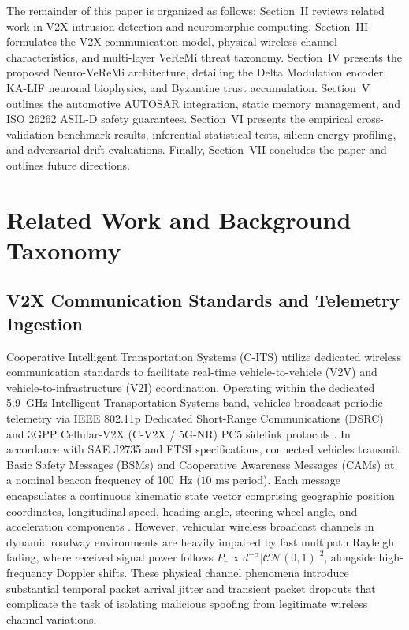 \documentclass[journal]{IEEEtran}
\begin{document}
The remainder of this paper is organized as follows: Section~II reviews related work in V2X intrusion detection and neuromorphic computing. Section~III formulates the V2X communication model, physical wireless channel characteristics, and multi-layer VeReMi threat taxonomy. Section~IV presents the proposed Neuro-VeReMi architecture, detailing the Delta Modulation encoder, KA-LIF neuronal biophysics, and Byzantine trust accumulation. Section~V outlines the automotive AUTOSAR integration, static memory management, and ISO 26262 ASIL-D safety guarantees. Section~VI presents the empirical cross-validation benchmark results, inferential statistical tests, silicon energy profiling, and adversarial drift evaluations. Finally, Section~VII concludes the paper and outlines future directions.

\section{Related Work and Background Taxonomy}

\subsection{V2X Communication Standards and Telemetry Ingestion}
Cooperative Intelligent Transportation Systems (C-ITS) utilize dedicated wireless communication standards to facilitate real-time vehicle-to-vehicle (V2V) and vehicle-to-infrastructure (V2I) coordination. Operating within the dedicated 5.9~GHz Intelligent Transportation Systems band, vehicles broadcast periodic telemetry via IEEE 802.11p Dedicated Short-Range Communications (DSRC) and 3GPP Cellular-V2X (C-V2X / 5G-NR) PC5 sidelink protocols \cite{abdelhakeem2025survey, zhang2025vehicle}. In accordance with SAE J2735 and ETSI specifications, connected vehicles transmit Basic Safety Messages (BSMs) and Cooperative Awareness Messages (CAMs) at a nominal beacon frequency of 100~Hz ($10\text{ ms}$ period). Each message encapsulates a continuous kinematic state vector comprising geographic position coordinates, longitudinal speed, heading angle, steering wheel angle, and acceleration components \cite{moradi2023dsrc}. However, vehicular wireless broadcast channels in dynamic roadway environments are heavily impaired by fast multipath Rayleigh fading, where received signal power follows $P_r \propto d^{-\alpha} |\mathcal{CN}(0,1)|^2$, alongside high-frequency Doppler shifts. These physical channel phenomena introduce substantial temporal packet arrival jitter and transient packet dropouts that complicate the task of isolating malicious spoofing from legitimate wireless channel variations.
\end{document}
